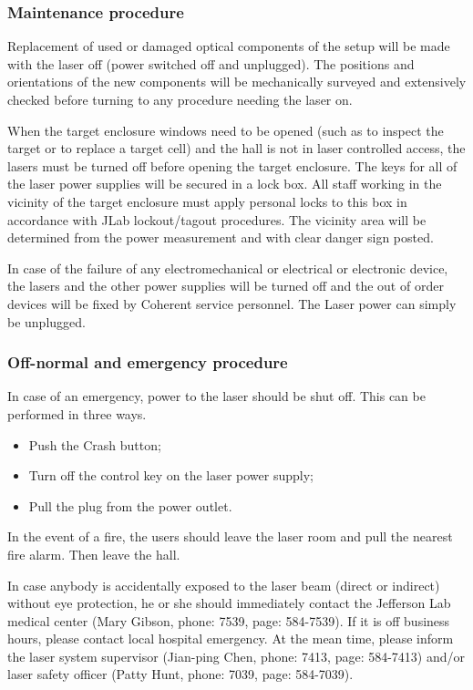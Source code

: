 \subsubsection{Maintenance procedure}

Replacement of used or damaged optical components of the setup will be made with the
laser off (power switched off and unplugged).  The positions and orientations of the new components will be mechanically
surveyed and extensively checked before turning to any procedure needing the laser on.

When the target enclosure windows need to be opened (such as to inspect
the target or to replace a 
target cell) and the hall is not in laser controlled access, 
the lasers must be turned off before opening the target enclosure.
The keys for all of the laser power
supplies will be secured in a lock box.  All staff working in the
vicinity of the target enclosure 
must apply personal locks to this box in accordance with
JLab lockout/tagout procedures.
The vicinity area will be determined
from the power measurement and with clear danger sign posted.

In case of the failure of any electromechanical or electrical or electronic device,
the lasers and the other power supplies will be turned off and the out of order devices
will be fixed by Coherent service personnel. The Laser power
can simply be unplugged.


\subsubsection{Off-normal and emergency procedure}

In case of an emergency, power to the laser should be shut off.
This can be performed in three ways.
\begin {itemize}
\item Push the Crash button;
\item Turn off the control key on the laser power supply;
\item Pull the plug from the power outlet.
\end {itemize}

In the event of a fire, the users should leave the laser room and pull the 
nearest fire alarm. Then leave the hall.

In case anybody is accidentally exposed to the laser beam (direct or indirect)
without eye protection, he or she should immediately contact the Jefferson
Lab medical center (Mary Gibson, phone: 7539, page: 584-7539). If it is 
off business hours, please contact local hospital emergency. At the mean time,
please inform the laser system supervisor (Jian-ping Chen, phone: 7413,
page: 584-7413) and/or laser safety officer (Patty Hunt, phone: 7039,
page: 584-7039). 


